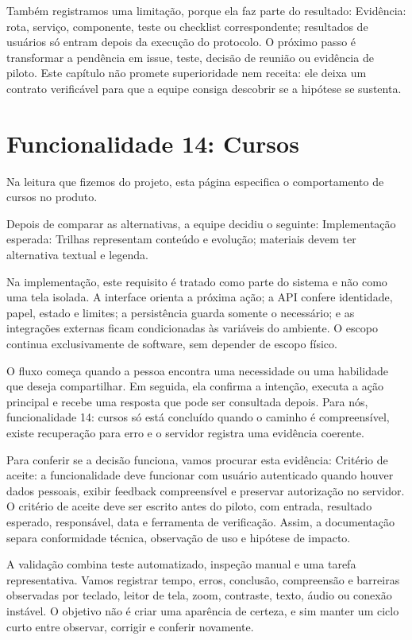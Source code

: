 \documentclass[12pt,oneside,a4paper,article]{abntex2}
\begin{document}
Também registramos uma limitação, porque ela faz parte do resultado: Evidência: rota, serviço, componente, teste ou checklist correspondente; resultados de usuários só entram depois da execução do protocolo. O próximo passo é transformar a pendência em issue, teste, decisão de reunião ou evidência de piloto. Este capítulo não promete superioridade nem receita: ele deixa um contrato verificável para que a equipe consiga descobrir se a hipótese se sustenta.

\section{Funcionalidade 14: Cursos}
Na leitura que fizemos do projeto, esta página especifica o comportamento de cursos no produto.

Depois de comparar as alternativas, a equipe decidiu o seguinte: Implementação esperada: Trilhas representam conteúdo e evolução; materiais devem ter alternativa textual e legenda.

Na implementação, este requisito é tratado como parte do sistema e não como uma tela isolada. A interface orienta a próxima ação; a API confere identidade, papel, estado e limites; a persistência guarda somente o necessário; e as integrações externas ficam condicionadas às variáveis do ambiente. O escopo continua exclusivamente de software, sem depender de escopo físico.

O fluxo começa quando a pessoa encontra uma necessidade ou uma habilidade que deseja compartilhar. Em seguida, ela confirma a intenção, executa a ação principal e recebe uma resposta que pode ser consultada depois. Para nós, funcionalidade 14: cursos só está concluído quando o caminho é compreensível, existe recuperação para erro e o servidor registra uma evidência coerente.

Para conferir se a decisão funciona, vamos procurar esta evidência: Critério de aceite: a funcionalidade deve funcionar com usuário autenticado quando houver dados pessoais, exibir feedback compreensível e preservar autorização no servidor. O critério de aceite deve ser escrito antes do piloto, com entrada, resultado esperado, responsável, data e ferramenta de verificação. Assim, a documentação separa conformidade técnica, observação de uso e hipótese de impacto.

A validação combina teste automatizado, inspeção manual e uma tarefa representativa. Vamos registrar tempo, erros, conclusão, compreensão e barreiras observadas por teclado, leitor de tela, zoom, contraste, texto, áudio ou conexão instável. O objetivo não é criar uma aparência de certeza, e sim manter um ciclo curto entre observar, corrigir e conferir novamente.
\end{document}
